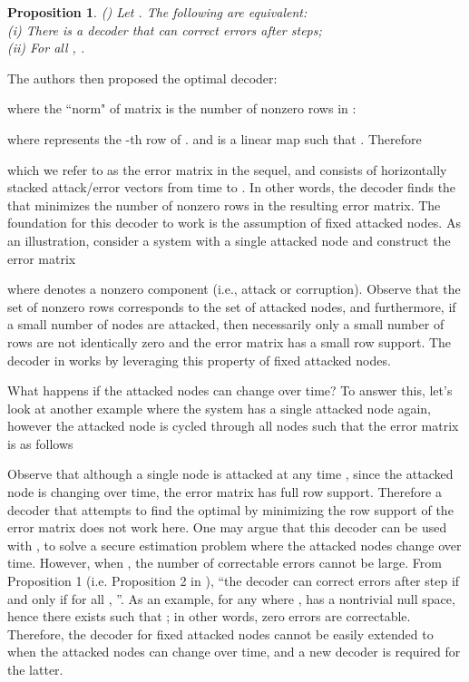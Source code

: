 \documentclass[journal]{IEEEtran}
\newtheorem{prop}{\bf{Proposition}}
\begin{document}
\begin{prop}  \emph{(\hspace{1sp}\cite{Fawzi2014})}  \label{prop:Fawzi} Let . The following are equivalent:\\
(i) There is a decoder that can correct  errors after  steps;\\
(ii) For all , .
\end{prop}


\noindent The authors then proposed the optimal decoder:

where the  ``norm" of matrix  is the number of nonzero rows in  \cite{Fawzi2014}:

where  represents the -th row of .  and  is a linear map such that . Therefore

which we refer to as the error matrix in the sequel, and consists of horizontally stacked attack/error vectors from time  to .
In other words, the decoder finds the  that minimizes the number of nonzero rows in the resulting error matrix. The foundation for this decoder to work is the assumption of fixed attacked nodes.
As an illustration, consider a system with a single attacked node and construct the error matrix

where  denotes a nonzero component (i.e., attack or corruption). Observe that the set of nonzero rows corresponds to the set of attacked nodes, and furthermore, if a small number of nodes are attacked, then necessarily only a small number of rows are not identically zero and the error matrix has a small row support. The decoder in \cite{Fawzi2014} works by leveraging this property of fixed attacked nodes. 


What happens if the attacked nodes can change over time? To answer this, let's look at another example where the system has a single attacked node again, however the attacked node is cycled through all nodes such that the error matrix is as follows

Observe that although a single node is attacked at any time , since the attacked node is changing over time, the error matrix has full row support. Therefore a decoder that attempts to find the optimal  by minimizing the row support of the error matrix does not work here. One may argue that this decoder can be used with , to solve a secure estimation problem where the attacked nodes change over time. 
However, when , the number of correctable errors cannot be large.
From Proposition 1 (i.e. Proposition 2 in \cite{Fawzi2014}), ``the decoder can correct  errors after  step if and only if for all , ''. 
As an example, for any  where ,  has a nontrivial null space, hence there exists  such that ; in other words, zero errors are correctable. Therefore, the decoder for fixed attacked nodes cannot be easily extended to when the attacked nodes can change over time, and a new decoder is required for the latter.
\end{document}
